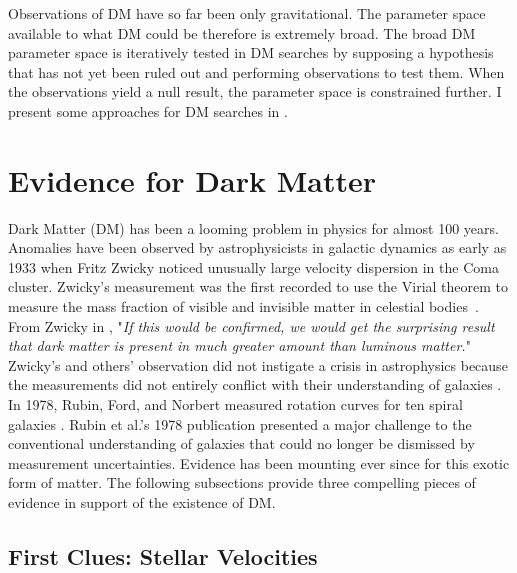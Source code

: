 Observations of DM have so far been only gravitational.
The parameter space available to what DM could be therefore is extremely broad.
The broad DM parameter space is iteratively tested in DM searches by supposing a hypothesis that has not yet been ruled out and performing observations to test them.
When the observations yield a null result, the parameter space is constrained further.
I present some approaches for DM searches in .

\section{Evidence for Dark Matter}\label{sec:evidence4dm}

Dark Matter (DM) has been a looming problem in physics for almost 100 years.
Anomalies have been observed by astrophysicists in galactic dynamics as early as 1933 when Fritz Zwicky noticed unusually large velocity dispersion in the Coma cluster.
Zwicky's measurement was the first recorded to use the Virial theorem to measure the mass fraction of visible and invisible matter in celestial bodies~\cite{Hooper:DMHistory}.
From Zwicky in \cite{Zwicky:1933}, "\textit{If this would be confirmed, we would get the surprising result that dark matter is present in much greater amount than luminous matter.}"
Zwicky's and others' observation did not instigate a crisis in astrophysics because the measurements did not entirely conflict with their understanding of galaxies \cite{Hooper:DMHistory}.
In 1978, Rubin, Ford, and Norbert measured rotation curves for ten spiral galaxies \cite{Rubin:1978}.
Rubin et al.'s 1978 publication presented a major challenge to the conventional understanding of galaxies that could no longer be dismissed by measurement uncertainties.
Evidence has been mounting ever since for this exotic form of matter.
The following subsections provide three compelling pieces of evidence in support of the existence of DM.

\subsection{First Clues: Stellar Velocities\label{sec:ev4dm_stars}}

